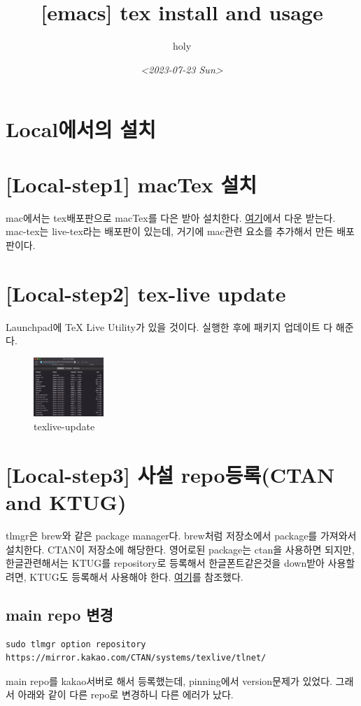 \documentclass[11pt]{article}
\author{holy}
\date{\textit{<2023-07-23 Sun>}}
\title{[emacs] tex install and usage}
\begin{document}
\maketitle
\tableofcontents


\section{Local에서의 설치}
\label{sec:org72ad065}
\section{[Local-step1] macTex 설치}
\label{sec:org6434a25}
mac에서는 tex배포판으로 macTex를 다은 받아 설치한다.  \href{https://tug.org/mactex/mactex-download.html}{여기}에서 다운
받는다. mac-tex는 live-tex라는 배포판이 있는데, 거기에 mac관련 요소를
추가해서 만든 배포판이다.
\section{[Local-step2] tex-live update}
\label{sec:org416de3e}
Launchpad에 \TeX{} Live Utility가 있을 것이다. 실행한 후에 패키지
업데이트 다 해준다.
\begin{figure}[htbp]
\centering
\includegraphics[width=100px]{../static/img/tex/tex-update.png}
\caption{\label{fig:orgd744de5}texlive-update}
\end{figure}
\section{[Local-step3] 사설 repo등록(CTAN and KTUG)}
\label{sec:orga60b3e7}
tlmgr은 brew와 같은 package manager다. brew처럼 저장소에서 package를
가져와서 설치한다. CTAN이 저장소에 해당한다. 영어로된 package는 ctan을
사용하면 되지만, 한글관련해서는 KTUG를 repository로 등록해서
한글폰트같은것을 down받아 사용할려면, KTUG도 등록해서 사용해야 한다.
\href{http://wiki.ktug.org/wiki/wiki.php/KtugPrivateRepository}{여기}를 참조했다.
\subsection{main repo 변경}
\label{sec:org43a56af}
\begin{verbatim}
sudo tlmgr option repository https://mirror.kakao.com/CTAN/systems/texlive/tlnet/
\end{verbatim}
main repo를 kakao서버로 해서 등록했는데, pinning에서 version문제가
있었다. 그래서 아래와 같이 다른 repo로 변경하니 다른 에러가 났다.
\end{document}
